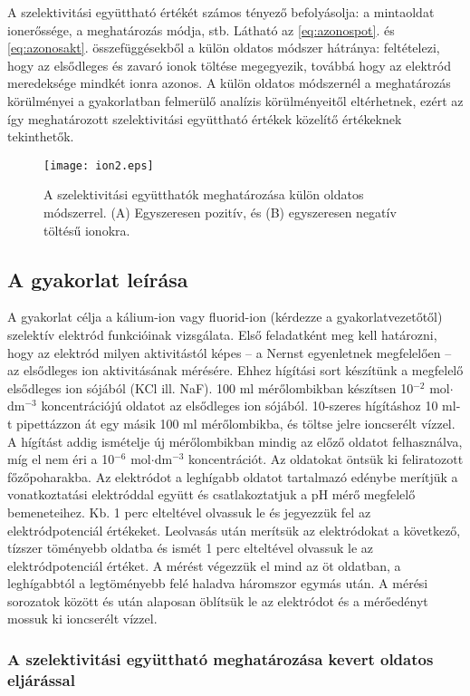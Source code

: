 A szelektivitási együttható értékét számos tényező befolyásolja: a mintaoldat ionerőssége, a meghatározás módja, stb.
Látható az \ref{eq:azonospot}. és \ref{eq:azonosakt}. összefüggésekből a külön oldatos módszer hátránya: feltételezi, hogy az elsődleges és zavaró ionok töltése megegyezik, továbbá hogy az elektród meredeksége mindkét ionra azonos.
A külön oldatos módszernél a meghatározás körülményei a gyakorlatban felmerülő analízis körülményeitől eltérhetnek, ezért az így meghatározott szelektivitási együttható értékek közelítő értékeknek tekinthetők.

\begin{figure}
\centering
\texttt{[image: ion2.eps]}
\caption{A szelektivitási együtthatók meghatározása külön oldatos módszerrel. (A) Egyszeresen pozitív, és (B) egyszeresen negatív töltésű ionokra.}
\label{fig:ion2}
\end{figure}

\subsection{A gyakorlat leírása}
A gyakorlat célja a kálium-ion vagy fluorid-ion (kérdezze a gyakorlatvezetőtől) szelektív elektród funkcióinak vizsgálata.
Első feladatként meg kell határozni, hogy az elektród milyen aktivitástól képes – a Nernst egyenletnek megfelelően – az elsődleges ion aktivitásának mérésére.
Ehhez hígítási sort készítünk a megfelelő elsődleges ion sójából (KCl ill. NaF).
100 ml mérőlombikban készítsen 10$^{-2}$ mol$\cdot$dm$^{-3}$ koncentrációjú oldatot az elsődleges ion sójából.
10-szeres hígításhoz 10 ml-t pipettázzon át egy másik 100 ml mérőlombikba, és töltse jelre ioncserélt vízzel.
A hígítást addig ismételje új mérőlombikban mindig az előző oldatot felhasználva, míg el nem éri a 10$^{-6}$ mol$\cdot$dm$^{-3}$ koncentrációt.
Az oldatokat öntsük ki feliratozott főzőpoharakba.
Az elektródot a leghígabb oldatot tartalmazó edénybe merítjük a vonatkoztatási elektróddal együtt és csatlakoztatjuk a pH mérő megfelelő bemeneteihez.
Kb. 1 perc elteltével olvassuk le és jegyezzük fel az elektródpotenciál értékeket.
Leolvasás után merítsük az elektródokat a következő, tízszer töményebb oldatba és ismét 1 perc elteltével olvassuk le az elektródpotenciál értéket.
A mérést végezzük el mind az öt oldatban, a leghígabbtól a legtöményebb felé haladva háromszor egymás után.
A mérési sorozatok között és után alaposan öblítsük le az elektródot és a mérőedényt mossuk ki ioncserélt vízzel.

\subsubsection{A szelektivitási együttható meghatározása kevert oldatos eljárással}

